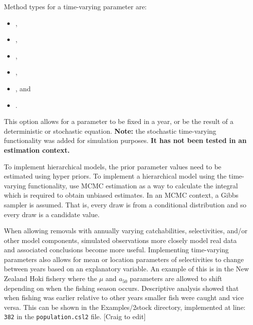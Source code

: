 Method types for a time-varying parameter are:

\begin{itemize}
\item {},
\item {},
\item {},
\item {},
\item {}, and
\item {}.
\end{itemize}

This option allows for a parameter to be fixed in a year, or be the result of a deterministic or stochastic equation. \textbf{Note:} the stochastic time-varying functionality was added for simulation purposes. \textbf{It has not been tested in an estimation context.}

To implement hierarchical models, the prior parameter values need to be estimated using hyper priors. To implement a hierarchical model using the time-varying functionality, use MCMC estimation as a way to calculate the integral which is required to obtain unbiased estimates. In an MCMC context, a Gibbs sampler is assumed. That is, every draw is from a conditional distribution and so every draw is a candidate value. 

When allowing removals with annually varying catchabilities, selectivities, and/or other model components, simulated observations more closely model real data and associated conclusions become more useful. Implementing time-varying parameters also allows for mean or location parameters of selectivities to change between years based on an explanatory variable. An example of this is in the New Zealand Hoki fishery where the $\mu$ and $a_{50}$ parameters are allowed to shift depending on when the fishing season occurs. Descriptive analysis showed that when fishing was earlier relative to other years smaller fish were caught and vice versa. This can be shown in the Examples/2stock directory, implemented at line: \texttt{382} in the \texttt{population.csl2} file. [Craig to edit]

\subsubsection[Constant (year blocks)]{}\label{sec:TimeVarying-Constant}

